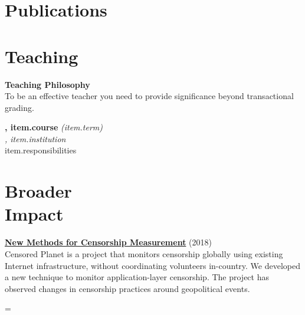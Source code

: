 \documentclass[margin,11pt]{res} %
\newenvironment{absolutelynopagebreak}
  {\par\nobreak\vfil\penalty0\vfilneg
   \vtop\bgroup}
  {\par\xdef\tpd{\the\prevdepth}\egroup
   \prevdepth=\tpd}
\begin{document}
\vspace{6pt}
\section{\large Publications}

{%
{%

\vspace{6pt}
\section{\large Teaching}

{\bf Teaching Philosophy}\\
To be an effective teacher you need to provide significance beyond transactional grading.


{%
\begin{samepage}
{\bf{},  {{item.course}}}  \emph{({{item.term}})}\\
\emph{, {{item.institution}}}\\
{{item.responsibilities}}
\end{samepage}

{%

\vspace{6pt}
\section{\large Broader\\Impact}

\begin{samepage}
\begin{absolutelynopagebreak}
\textbf{\href{https://censoredplanet.com}{New Methods for Censorship Measurement}} (2018)\\
Censored Planet is a project that monitors censorship globally using existing Internet infrastructure, without coordinating volunteers in-country. We developed a new technique to monitor application-layer censorship. The project has observed changes in censorship practices around geopolitical events.
\end{absolutelynopagebreak}
\end{samepage}

}}}}
\end{document}
